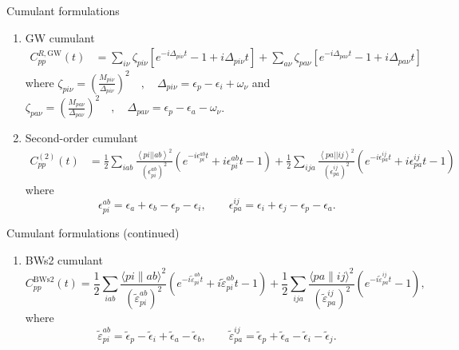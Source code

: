 \documentclass[aspectratio=169]{beamer}
\begin{document}
\begin{frame}{Cumulant formulations}
\begin{enumerate}
  \item GW cumulant
  \begin{align}
    C_{pp}^{R,\mathrm{GW}}(t) 
      &= \sum_{i\nu} \zeta_{pi\nu} \left[ e^{-i\Delta_{pi\nu} t} - 1 + i\Delta_{pi\nu} t \right] 
       + \sum_{a\nu} \zeta_{pa\nu} \left[ e^{-i\Delta_{pa\nu} t} - 1 + i\Delta_{pa\nu} t \right]
  \end{align}
  where $\zeta_{pi\nu} = \left(\frac{M_{pi\nu}}{\Delta_{pi\nu}}\right)^2\quad,\quad\Delta_{pi\nu} = \epsilon_p - \epsilon_i + \omega_\nu$ and $\zeta_{pa\nu} = \left(\frac{M_{pa\nu}}{\Delta_{pa\nu}}\right)^2 \quad,\quad\Delta_{pa\nu} = \epsilon_p - \epsilon_a - \omega_\nu$.

  \item Second-order cumulant
  \begin{align}
    C_{pp}^{(2)}(t) 
      &= \frac{1}{2}\sum_{iab} \frac{\left< pi \left| \right| ab \right>^2}{\left(\epsilon_{pi}^{ab}\right)^2}
\left(e^{-i \epsilon_{pi}^{ab} t} +i \epsilon_{pi}^{ab} t -1 \right)
+\frac{1}{2}\sum_{ija} \frac{\left< pa \left| \right| ij \right>^2}{\left(\epsilon_{pa}^{ij}\right)^2}
\left(e^{-i \epsilon_{pa}^{ij} t} +i \epsilon_{pa}^{ij} t -1 \right) 
  \end{align}
  where
  \[
    \epsilon_{pi}^{ab} = \epsilon_{a}+\epsilon_{b}-\epsilon_{p}-\epsilon_{i},
    \qquad
    \epsilon_{pa}^{ij} = \epsilon_{i}+\epsilon_{j}-\epsilon_{p}-\epsilon_{a}.
  \]

\end{enumerate}
\end{frame}
\begin{frame}{Cumulant formulations (continued)}
\begin{enumerate}
\item BWs2 cumulant
  \begin{equation}
    C_{pp}^{\mathrm{BWs2}}(t) = 
    \frac{1}{2} \sum_{i a b}\frac{\langle p i \| a b\rangle^2 }{\left(\tilde{\varepsilon}_{p i}^{a b}\right)^2}
      \left(e^{-i \tilde{\varepsilon}_{p i}^{a b} t} + i \tilde{\varepsilon}_{p i}^{a b} t -1 \right) 
    + \frac{1}{2}\sum_{i j a} \frac{\langle p a \| i j\rangle^2}{\left(\tilde{\varepsilon}_{p a}^{i j}\right)^2} 
      \left(e^{-i \tilde{\varepsilon}_{p a}^{i j} t} - 1 \right),
  \end{equation}
  where
  \[
    \tilde{\varepsilon}_{p i}^{a b} = \tilde{\epsilon}_p - \tilde{\epsilon}_i + \tilde{\epsilon}_a - \tilde{\epsilon}_b,
    \qquad
    \tilde{\varepsilon}_{p a}^{i j} = \tilde{\epsilon}_p + \tilde{\epsilon}_a - \tilde{\epsilon}_i - \tilde{\epsilon}_j.
  \]
\end{enumerate}
\end{frame}
\end{document}
